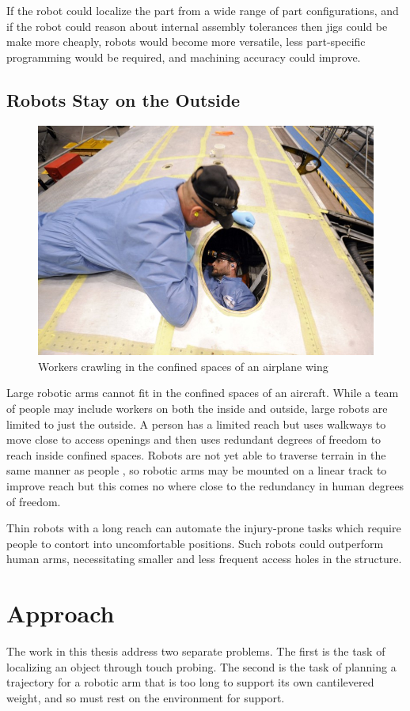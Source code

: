 \documentclass[../thesis.tex]{subfiles}
\begin{document}
If the robot could localize the part from a wide range of part configurations, and if the robot could reason about internal assembly tolerances then jigs could be make more cheaply, robots would become more versatile, less part-specific programming would be required, and machining accuracy could improve.

\subsection{Robots Stay on the Outside}

\begin{figure}
  \centering
  \label{fig:PeopleInWing}
  \includegraphics[width=.7\linewidth]{./Introduction/PeopleInWing.jpg}  
  \caption{Workers crawling in the confined spaces of an airplane wing}
\end{figure}

Large robotic arms cannot fit in the confined spaces of an aircraft.
While a team of people may include workers on both the inside and outside, large robots are limited to just the outside.
A person has a limited reach but uses walkways to move close to access openings and then uses redundant degrees of freedom to reach inside confined spaces.
Robots are not yet able to traverse terrain in the same manner as people \cite{Atkeson2015}, so robotic arms may be mounted on a linear track to improve reach \cite{Saund2013} but this comes no where close to the redundancy in human degrees of freedom.

Thin robots with a long reach can automate the injury-prone tasks which require people to contort into uncomfortable positions.
Such robots could outperform human arms, necessitating smaller and less frequent access holes in the structure.




\section{Approach}
The work in this thesis address two separate problems. The first is the task of localizing an object through touch probing.
The second is the task of planning a trajectory for a robotic arm that is too long to support its own cantilevered weight, and so must rest on the environment for support.
\end{document}
